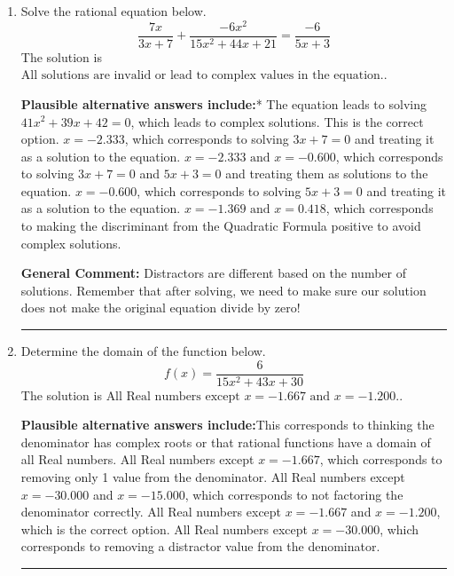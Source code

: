\documentclass{extbook}[14pt]
\newcommand{\litem}[1]{\item #1

\rule{\textwidth}{0.4pt}}
\begin{document}
\begin{enumerate}\litem{
Solve the rational equation below.
\[ \frac{7x}{3x + 7} + \frac{-6x^{2}}{15x^{2} +44 x + 21} = \frac{-6}{5x + 3} \]The solution is \( \text{All solutions are invalid or lead to complex values in the equation.} \).\begin{enumerate}[label=\Alph*.]
\textbf{Plausible alternative answers include:}* The equation leads to solving $41x^{2} +39 x + 42=0$, which leads to complex solutions. This is the correct option.
$x = -2.333$, which corresponds to solving $3x + 7 = 0$ and treating it as a solution to the equation.
$x = -2.333 \text{ and } x = -0.600$, which corresponds to solving $3x + 7 = 0$ and $5x + 3 = 0$ and treating them as solutions to the equation.
$x = -0.600$, which corresponds to solving $5x + 3 = 0$ and treating it as a solution to the equation.
$x = -1.369 \text{ and } x = 0.418$, which corresponds to making the discriminant from the Quadratic Formula positive to avoid complex solutions.
\end{enumerate}

\textbf{General Comment:} Distractors are different based on the number of solutions. Remember that after solving, we need to make sure our solution does not make the original equation divide by zero!
}
\litem{
Determine the domain of the function below.
\[ f(x) = \frac{6}{15x^{2} +43 x + 30} \]The solution is \( \text{All Real numbers except } x = -1.667 \text{ and } x = -1.200. \).\begin{enumerate}[label=\Alph*.]
\textbf{Plausible alternative answers include:}This corresponds to thinking the denominator has complex roots or that rational functions have a domain of all Real numbers.
All Real numbers except $x = -1.667$, which corresponds to removing only 1 value from the denominator.
All Real numbers except $x = -30.000$ and $x = -15.000$, which corresponds to not factoring the denominator correctly.
All Real numbers except $x = -1.667$ and $x = -1.200$, which is the correct option.
All Real numbers except $x = -30.000$, which corresponds to removing a distractor value from the denominator.
\end{enumerate}

}
\end{enumerate}
\end{document}

